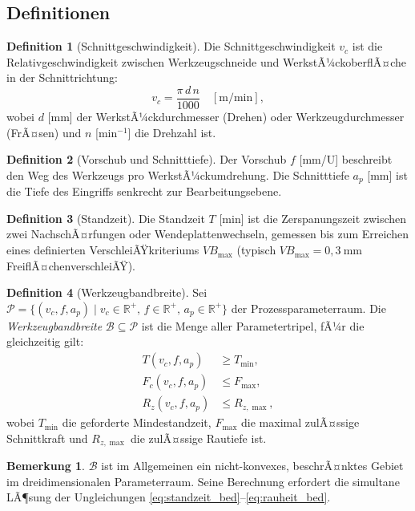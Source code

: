 ﻿\documentclass[a4paper,12pt]{article}
\theoremstyle{definition}
\newtheorem{definition}{Definition}
\newtheorem{bemerkung}{Bemerkung}
\begin{document}
\subsection{Definitionen}

\begin{definition}[Schnittgeschwindigkeit]
  Die Schnittgeschwindigkeit $v_c$ ist die Relativgeschwindigkeit zwischen
  Werkzeugschneide und WerkstÃ¼ckoberflÃ¤che in der Schnittrichtung:
  \[
    v_c = \frac{\pi \, d \, n}{1000} \quad [\mathrm{m/min}],
  \]
  wobei $d$ [mm] der WerkstÃ¼ckdurchmesser (Drehen) oder Werkzeugdurchmesser
  (FrÃ¤sen) und $n$ [min$^{-1}$] die Drehzahl ist.
\end{definition}

\begin{definition}[Vorschub und Schnitttiefe]
  Der Vorschub $f$ [mm/U] beschreibt den Weg des Werkzeugs pro WerkstÃ¼ckumdrehung.
  Die Schnitttiefe $a_p$ [mm] ist die Tiefe des Eingriffs senkrecht zur
  Bearbeitungsebene.
\end{definition}

\begin{definition}[Standzeit]
  Die Standzeit $T$ [min] ist die Zerspanungszeit zwischen zwei NachschÃ¤rfungen
  oder Wendeplattenwechseln, gemessen bis zum Erreichen eines definierten
  VerschleiÃŸkriteriums $VB_{\max}$ (typisch $VB_{\max} = 0{,}3~\mathrm{mm}$
  FreiflÃ¤chenverschleiÃŸ).
\end{definition}

\begin{definition}[Werkzeugbandbreite]
\label{def:bandbreite}
  Sei $\mathcal{P} = \{(v_c, f, a_p) \mid v_c \in \mathbb{R}^+,\, f \in \mathbb{R}^+,\,
  a_p \in \mathbb{R}^+\}$ der Prozessparameterraum. Die
  \emph{Werkzeugbandbreite} $\mathcal{B} \subseteq \mathcal{P}$ ist die Menge
  aller Parametertripel, fÃ¼r die gleichzeitig gilt:
  \begin{align}
    T(v_c, f, a_p) &\geq T_{\min}, \label{eq:standzeit_bed} \\
    F_c(v_c, f, a_p) &\leq F_{\max}, \label{eq:kraft_bed} \\
    R_z(v_c, f, a_p) &\leq R_{z,\max}, \label{eq:rauheit_bed}
  \end{align}
  wobei $T_{\min}$ die geforderte Mindestandzeit, $F_{\max}$ die maximal
  zulÃ¤ssige Schnittkraft und $R_{z,\max}$ die zulÃ¤ssige Rautiefe ist.
\end{definition}

\begin{bemerkung}
  $\mathcal{B}$ ist im Allgemeinen ein nicht-konvexes, beschrÃ¤nktes Gebiet im
  dreidimensionalen Parameterraum. Seine Berechnung erfordert die simultane LÃ¶sung
  der Ungleichungen \eqref{eq:standzeit_bed}--\eqref{eq:rauheit_bed}.
\end{bemerkung}
\end{document}
